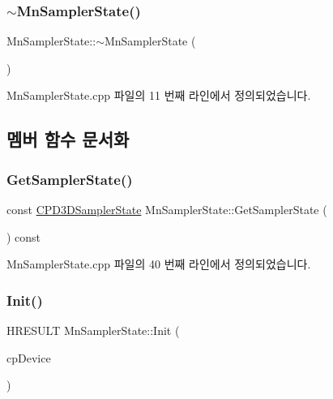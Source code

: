 \subsubsection{\texorpdfstring{$\sim$\+Mn\+Sampler\+State()}{~MnSamplerState()}}
{\footnotesize\ttfamily Mn\+Sampler\+State\+::$\sim$\+Mn\+Sampler\+State (\begin{DoxyParamCaption}{ }\end{DoxyParamCaption})}



Mn\+Sampler\+State.\+cpp 파일의 11 번째 라인에서 정의되었습니다.



\subsection{멤버 함수 문서화}
\mbox{\label{class_m_n_l_1_1_mn_sampler_state_a04ae5109c39ea08d8553c50387793558}} 
\subsubsection{\texorpdfstring{Get\+Sampler\+State()}{GetSamplerState()}}
{\footnotesize\ttfamily const \hyperlink{namespace_m_n_l_ae0141196161ecb3d3055523077ca3aa1}{C\+P\+D3\+D\+Sampler\+State} Mn\+Sampler\+State\+::\+Get\+Sampler\+State (\begin{DoxyParamCaption}{ }\end{DoxyParamCaption}) const}



Mn\+Sampler\+State.\+cpp 파일의 40 번째 라인에서 정의되었습니다.

\mbox{\label{class_m_n_l_1_1_mn_sampler_state_abef27e0e5a06502b2b15d0f96da13ef6}} 
\subsubsection{\texorpdfstring{Init()}{Init()}}
{\footnotesize\ttfamily H\+R\+E\+S\+U\+LT Mn\+Sampler\+State\+::\+Init (\begin{DoxyParamCaption}\item[{const \hyperlink{namespace_m_n_l_a1eec210db8f309a4a9ac0d9658784c31}{C\+P\+D3\+D\+Device} \&}]{cp\+Device }\end{DoxyParamCaption})}




